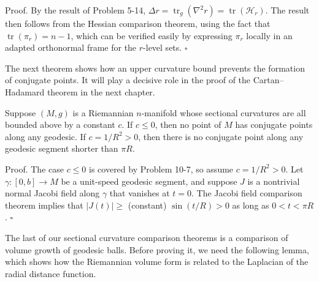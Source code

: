 Proof. By the result of Problem 5-14, $\Delta r = \operatorname{tr}_g(\nabla^2 r) = \operatorname{tr}(\mathcal{H}_r)$. The result then follows from the Hessian comparison theorem, using the fact that $\operatorname{tr}(\pi_r) = n - 1$, which can be verified easily by expressing $\pi_r$ locally in an adapted orthonormal frame for the $r$-level sets. $\square$

The next theorem shows how an upper curvature bound prevents the formation of conjugate points. It will play a decisive role in the proof of the Cartan--Hadamard theorem in the next chapter.

\begin{theorem}
\label{thm:conjugate-point-comparison-I}

Suppose $(M, g)$ is a Riemannian $n$-manifold whose sectional curvatures are all bounded above by a constant $c$. If $c \leq 0$, then no point of $M$ has conjugate points along any geodesic. If $c = 1/R^2 > 0$, then there is no conjugate point along any geodesic segment shorter than $\pi R$.

Proof. The case $c \leq 0$ is covered by Problem 10-7, so assume $c = 1/R^2 > 0$. Let $\gamma : [0, b] \to M$ be a unit-speed geodesic segment, and suppose $J$ is a nontrivial normal Jacobi field along $\gamma$ that vanishes at $t = 0$. The Jacobi field comparison theorem implies that $|J(t)| \geq$ (constant) $\sin(t/R) > 0$ as long as $0 < t < \pi R$. $\square$

\end{theorem}

The last of our sectional curvature comparison theorems is a comparison of volume growth of geodesic balls. Before proving it, we need the following lemma, which shows how the Riemannian volume form is related to the Laplacian of the radial distance function.

